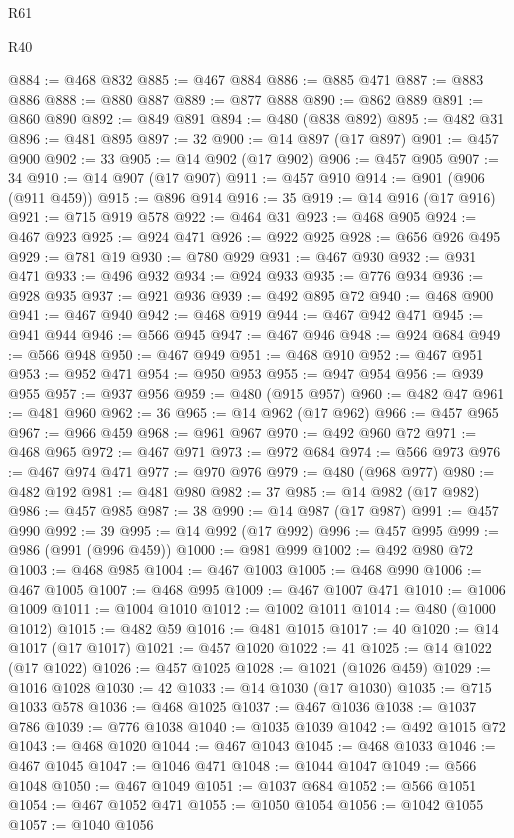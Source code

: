 \begin{lexlean}{R61}
\begin{lexlean}{R40}
\begin{coremodule}
{{{{{{{{{{{{{{{{{{{{{{{{{{{{{{{{{{{{{{{{{{{{{{{{{{{{{{{{{{{{{{{{{{{{{{{{{{{{{{{{{{{{{{{{{{{{{{{{{{{{{{{{{{{{{@884 := @468 @832
@885 := @467 @884
@886 := @885 @471
@887 := @883 @886
@888 := @880 @887
@889 := @877 @888
@890 := @862 @889
@891 := @860 @890
@892 := @849 @891
@894 := @480 (@838 @892)
@895 := @482 @31
@896 := @481 @895
@897 := 32
@900 := @14 @897 (@17 @897)
@901 := @457 @900
@902 := 33
@905 := @14 @902 (@17 @902)
@906 := @457 @905
@907 := 34
@910 := @14 @907 (@17 @907)
@911 := @457 @910
@914 := @901 (@906 (@911 @459))
@915 := @896 @914
@916 := 35
@919 := @14 @916 (@17 @916)
@921 := @715 @919 @578
@922 := @464 @31
@923 := @468 @905
@924 := @467 @923
@925 := @924 @471
@926 := @922 @925
@928 := @656 @926 @495
@929 := @781 @19
@930 := @780 @929
@931 := @467 @930
@932 := @931 @471
@933 := @496 @932
@934 := @924 @933
@935 := @776 @934
@936 := @928 @935
@937 := @921 @936
@939 := @492 @895 @72
@940 := @468 @900
@941 := @467 @940
@942 := @468 @919
@944 := @467 @942 @471
@945 := @941 @944
@946 := @566 @945
@947 := @467 @946
@948 := @924 @684
@949 := @566 @948
@950 := @467 @949
@951 := @468 @910
@952 := @467 @951
@953 := @952 @471
@954 := @950 @953
@955 := @947 @954
@956 := @939 @955
@957 := @937 @956
@959 := @480 (@915 @957)
@960 := @482 @47
@961 := @481 @960
@962 := 36
@965 := @14 @962 (@17 @962)
@966 := @457 @965
@967 := @966 @459
@968 := @961 @967
@970 := @492 @960 @72
@971 := @468 @965
@972 := @467 @971
@973 := @972 @684
@974 := @566 @973
@976 := @467 @974 @471
@977 := @970 @976
@979 := @480 (@968 @977)
@980 := @482 @192
@981 := @481 @980
@982 := 37
@985 := @14 @982 (@17 @982)
@986 := @457 @985
@987 := 38
@990 := @14 @987 (@17 @987)
@991 := @457 @990
@992 := 39
@995 := @14 @992 (@17 @992)
@996 := @457 @995
@999 := @986 (@991 (@996 @459))
@1000 := @981 @999
@1002 := @492 @980 @72
@1003 := @468 @985
@1004 := @467 @1003
@1005 := @468 @990
@1006 := @467 @1005
@1007 := @468 @995
@1009 := @467 @1007 @471
@1010 := @1006 @1009
@1011 := @1004 @1010
@1012 := @1002 @1011
@1014 := @480 (@1000 @1012)
@1015 := @482 @59
@1016 := @481 @1015
@1017 := 40
@1020 := @14 @1017 (@17 @1017)
@1021 := @457 @1020
@1022 := 41
@1025 := @14 @1022 (@17 @1022)
@1026 := @457 @1025
@1028 := @1021 (@1026 @459)
@1029 := @1016 @1028
@1030 := 42
@1033 := @14 @1030 (@17 @1030)
@1035 := @715 @1033 @578
@1036 := @468 @1025
@1037 := @467 @1036
@1038 := @1037 @786
@1039 := @776 @1038
@1040 := @1035 @1039
@1042 := @492 @1015 @72
@1043 := @468 @1020
@1044 := @467 @1043
@1045 := @468 @1033
@1046 := @467 @1045
@1047 := @1046 @471
@1048 := @1044 @1047
@1049 := @566 @1048
@1050 := @467 @1049
@1051 := @1037 @684
@1052 := @566 @1051
@1054 := @467 @1052 @471
@1055 := @1050 @1054
@1056 := @1042 @1055
@1057 := @1040 @1056
}}}}}}}}}}}}}}}}}}}}}}}}}}}}}}}}}}}}}}}}}}}}}}}}}}}}}}}}}}}}}}}}}}}}}}}}}}}}}}}}}}}}}}}}}}}}}}}}}}}}}}}}}}}}}
\end{coremodule}
\end{lexlean}
\end{lexlean}

